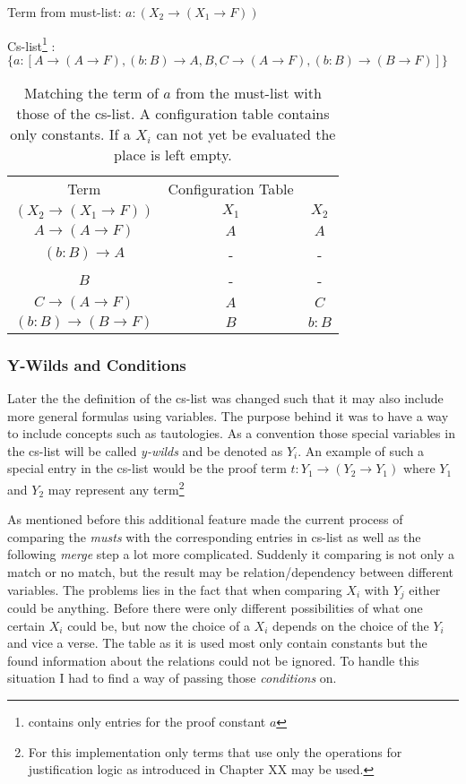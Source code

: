 \vspace{0.2cm}

Term from must-list: $a:(X_2\rightarrow (X_1 \rightarrow F))$

Cs-list\footnote{contains only entries for the proof constant $a$} : $\{a: [A \rightarrow (A \rightarrow F), (b:B) \rightarrow A, B, C \rightarrow (A \rightarrow F), (b:B) \rightarrow (B \rightarrow F)]\}$

\vspace{0.2cm}
\begin{table}[ht]
\centering
\begin{tabular}{ c || c c }
	Term									&	Configuration Table \\
	$(X_2\rightarrow (X_1 \rightarrow F))$	& $X_1$ & $X_2$ \\
	\hline
	$A \rightarrow (A \rightarrow F)$ 		& $A$ & $A$ \\
	$(b:B) \rightarrow A$ 					& - & - \\
	$B$ 									& - & - \\
	$C \rightarrow (A \rightarrow F)$ 		& $A$ & $C$\\
	$(b:B) \rightarrow (B \rightarrow F)$ 	& $B$ & $b:B$\\
\end{tabular}
\caption{Matching the term of $a$ from the must-list with those of the cs-list. A configuration table contains only constants. If a $X_i$ can not yet be evaluated the place is left empty.}
\end{table}


\subsubsection{Y-Wilds and Conditions}
Later the the definition of the cs-list was changed such that it may also include more general formulas using variables. The purpose behind it was to have a way to include concepts such as tautologies. As a convention those special variables in the cs-list will be called \emph{y-wilds} and be denoted as $Y_i$. An example of such a special entry in the cs-list would be the proof term $t:Y_1 \rightarrow (Y_2 \rightarrow Y_1)$ where $Y_1$ and $Y_2$ may represent any term\footnote{For this implementation only terms that use only the operations for justification logic as introduced in Chapter XX may be used.}

As mentioned before this additional feature made the current process of comparing the \emph{musts} with the corresponding entries in cs-list as well as the following \emph{merge} step a lot more complicated. Suddenly it comparing is not only a match or no match, but the result may be relation/dependency between different variables. The problems lies in the fact that when comparing $X_i$ with $Y_j$ either could be anything. Before there were only different possibilities of what one certain $X_i$ could be, but now the choice of a $X_i$ depends on the choice of the $Y_i$ and vice a verse. The table as it is used most only contain constants but the found information about the relations could not be ignored. To handle this situation I had to find a way of passing those \emph{conditions} on. 

